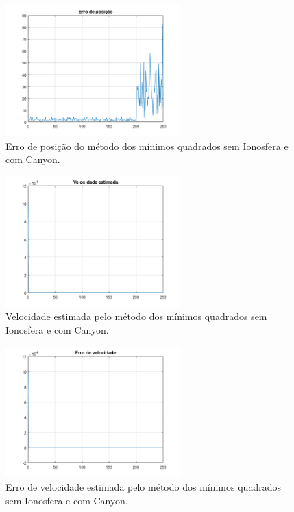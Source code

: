 \documentclass[palatino]{ist-report}
\begin{document}
\begin{figure}[ht]
	\centering
	\includegraphics[width=0.6\textwidth]{graphics/erro_posicao12.png}
	\caption{Erro de posição do método dos mínimos quadrados sem Ionosfera e com Canyon.}
	\label{eposicao12}
\end{figure}



\begin{figure}[ht]
	\centering
	\includegraphics[width=0.6\textwidth]{graphics/velocidade_estimada12.png}
	\caption{Velocidade estimada pelo método dos mínimos quadrados sem Ionosfera e com Canyon.}
	\label{velocidade12}
\end{figure}

\begin{figure}[ht]
	\centering
	\includegraphics[width=0.6\textwidth]{graphics/errodevelocidade12.png}
	\caption{Erro de velocidade estimada pelo método dos mínimos quadrados sem Ionosfera e com Canyon.}
	\label{evelocidade12}
\end{figure}
\end{document}
